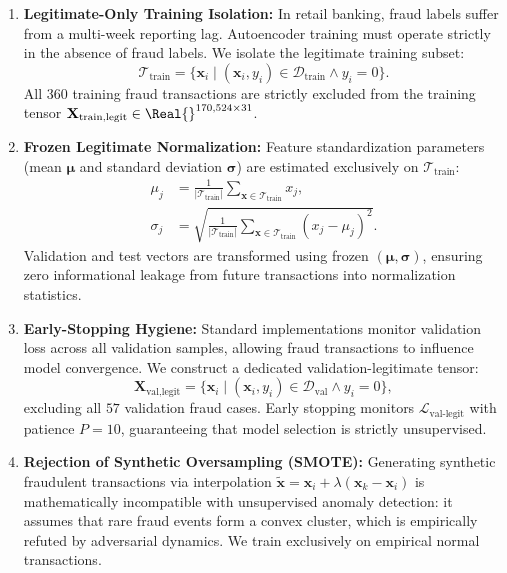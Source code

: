 \begin{enumerate}
    \item \textbf{Legitimate-Only Training Isolation:} In retail banking, fraud labels suffer from a multi-week reporting lag. Autoencoder training must operate strictly in the absence of fraud labels. We isolate the legitimate training subset:
    \begin{equation}
        \mathcal{T}_{\text{train}} = \{\mathbf{x}_i \mid (\mathbf{x}_i, y_i) \in \mathcal{D}_{\text{train}} \land y_i = 0\}.
    \end{equation}
    All $360$ training fraud transactions are strictly excluded from the training tensor $\mathbf{X}_{\text{train,legit}} \in \Real{}^{170,524 \times 31}$.

    \item \textbf{Frozen Legitimate Normalization:} Feature standardization parameters (mean $\boldsymbol{\mu}$ and standard deviation $\boldsymbol{\sigma}$) are estimated exclusively on $\mathcal{T}_{\text{train}}$:
    \begin{align}
        \mu_j &= \frac{1}{|\mathcal{T}_{\text{train}}|} \sum_{\mathbf{x} \in \mathcal{T}_{\text{train}}} x_j, \\
        \sigma_j &= \sqrt{\frac{1}{|\mathcal{T}_{\text{train}}|} \sum_{\mathbf{x} \in \mathcal{T}_{\text{train}}} (x_j - \mu_j)^2}.
    \end{align}
    Validation and test vectors are transformed using frozen $(\boldsymbol{\mu}, \boldsymbol{\sigma})$, ensuring zero informational leakage from future transactions into normalization statistics.

    \item \textbf{Early-Stopping Hygiene:} Standard implementations monitor validation loss across all validation samples, allowing fraud transactions to influence model convergence. We construct a dedicated validation-legitimate tensor:
    \begin{equation}
        \mathbf{X}_{\text{val,legit}} = \{\mathbf{x}_i \mid (\mathbf{x}_i, y_i) \in \mathcal{D}_{\text{val}} \land y_i = 0\},
    \end{equation}
    excluding all $57$ validation fraud cases. Early stopping monitors $\mathcal{L}_{\text{val-legit}}$ with patience $P=10$, guaranteeing that model selection is strictly unsupervised.

    \item \textbf{Rejection of Synthetic Oversampling (SMOTE):} Generating synthetic fraudulent transactions via interpolation $\tilde{\mathbf{x}} = \mathbf{x}_i + \lambda (\mathbf{x}_{k} - \mathbf{x}_i)$ is mathematically incompatible with unsupervised anomaly detection: it assumes that rare fraud events form a convex cluster, which is empirically refuted by adversarial dynamics. We train exclusively on empirical normal transactions.


\end{enumerate}
